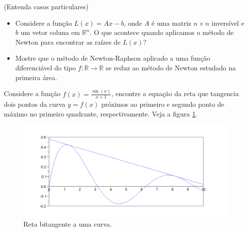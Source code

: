 \begin{exer}(Entenda casos particulares)
\begin{itemize}
\item Considere a função $L(x)=Ax-b$, onde $A$ é uma matriz $n\times n$ inversível e $b$ um vetor coluna em $\mathbb{R}^n$. O que acontece quando aplicamos o método de Newton para encontrar as raízes de $L(x)$?
\item Mostre que o método de Newton-Raphson aplicado a uma função diferenciável do tipo $f:\mathbb{R}\to\mathbb{R}$ se reduz ao método de Newton estudado na primeira área.
\end{itemize}

\end{exer}


\begin{exer}\label{prob_bitang}Considere a função $f(x)=\frac{\sin(x)}{x+1}$, encontre a equação da reta que tangencia dois pontos da curva $y=f(x)$ próximos ao primeiro e segundo ponto de máximo no primeiro quadrante, respectivamente. Veja a figura \ref{pic:bitang}.
\end{exer}
\begin{figure}
        \centering
	    \includegraphics[width=\textwidth]{cap_nlinsis/pics/curva_Q23}
		\caption{Reta bitangente a uma curva.}
		\label{pic:bitang}
	\end{figure}

